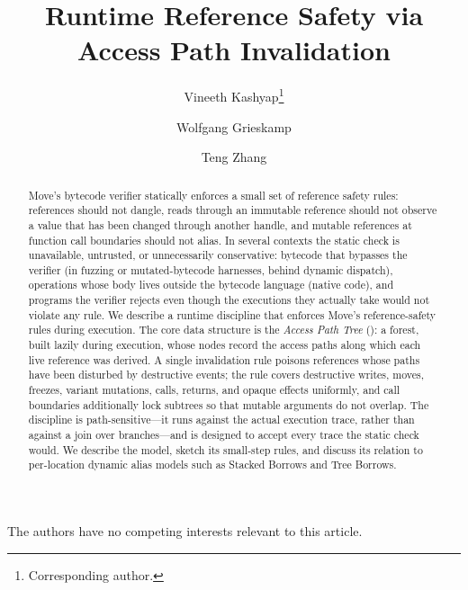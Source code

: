 \documentclass[runningheads]{llncs}
\begin{document}
\title{Runtime Reference Safety via Access Path Invalidation}

\author{Vineeth Kashyap\thanks{Corresponding author.} \and
        Wolfgang Grieskamp \and
        Teng Zhang}

\maketitle

\begin{abstract}
Move's bytecode verifier statically enforces a small set of reference
safety rules: references should not dangle, reads through an
immutable reference should not observe a value that has been changed
through another handle, and mutable references at function call
boundaries should not alias. In several contexts the static check is
unavailable, untrusted, or unnecessarily conservative: bytecode that
bypasses the verifier (in fuzzing or mutated-bytecode harnesses,
behind dynamic dispatch), operations whose body lives outside the
bytecode language (native code), and programs the verifier rejects
even though the executions they actually take would not violate any
rule. We describe a runtime discipline that enforces Move's
reference-safety rules during execution. The core data structure is
the \emph{Access Path Tree} (\apt): a forest, built lazily during
execution, whose nodes record the access paths along which each live
reference was derived. A single invalidation rule poisons references
whose paths have been disturbed by destructive events; the rule
covers destructive writes, moves, freezes, variant mutations, calls,
returns, and opaque effects uniformly, and call boundaries
additionally lock subtrees so that mutable arguments do not overlap.
The discipline is path-sensitive---it runs against the actual
execution trace, rather than against a join over branches---and is
designed to accept every trace the static check would.  We describe
the model, sketch its small-step rules, and discuss its relation to
per-location dynamic alias models such as Stacked Borrows and Tree
Borrows.
\end{abstract}








\begin{credits}
\subsubsection{\discintname}
The authors have no competing interests relevant to this article.
\end{credits}



\end{document}
